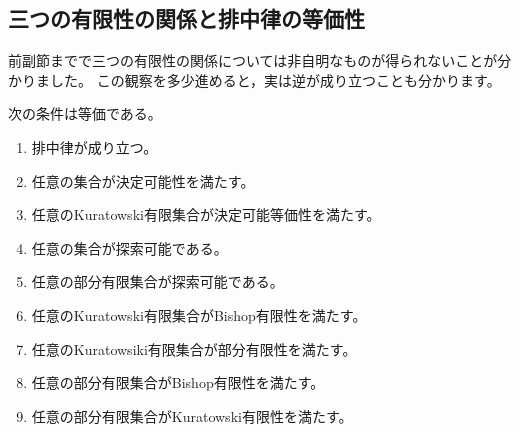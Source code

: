 \subsection{三つの有限性の関係と排中律の等価性}
前副節までで三つの有限性の関係については非自明なものが得られないことが分かりました。
この観察を多少進めると，実は逆が成り立つことも分かります。

\begin{proposition}\label{prop::characterize_lem}
    次の条件は等価である。
    \begin{enumerate}
        \item\label{prop::characterize_lem::item_1} 
            排中律が成り立つ。
        \item\label{prop::characterize_lem::item_2}  
            任意の集合が決定可能性を満たす。
        \item\label{prop::characterize_lem::item_3}  
            任意のKuratowski有限集合が決定可能等価性を満たす。
        \item\label{prop::characterize_lem::item_4}
            任意の集合が探索可能である。
        \item\label{prop::characterize_lem::item_5}  
            任意の部分有限集合が探索可能である。
        \item\label{prop::characterize_lem::item_6}  
            任意のKuratowski有限集合がBishop有限性を満たす。
        \item\label{prop::characterize_lem::item_7}  
            任意のKuratowsiki有限集合が部分有限性を満たす。
        \item\label{prop::characterize_lem::item_8}  
            任意の部分有限集合がBishop有限性を満たす。
        \item\label{prop::characterize_lem::item_9}  
            任意の部分有限集合がKuratowski有限性を満たす。
    \end{enumerate}
\end{proposition}

